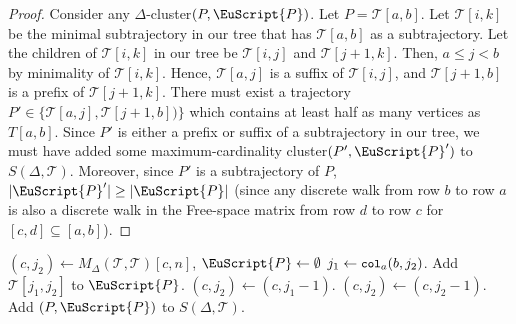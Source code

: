 \documentclass[11pt]{article}
\newcommand{\fancy}[1]{\EuScript{#1}}
\newcommand{\maxcol}{\texttt{\small col}}
\newcommand{\pathlet}{cluster\xspace}
\newcommand{\cT}{\mathcal{T}}
\begin{document}
\begin{proof} 
    Consider any $\Delta$-\pathlet $(P, {\fancy{P}})$.
    Let $P = \mathcal{T}[a, b]$.
    Let $\cT[i, k]$ be the minimal subtrajectory in our tree that has $\cT[a, b]$ as a subtrajectory.
    Let the children of $\cT[i, k]$ in our tree be $\cT[i, j]$ and $\cT[j+1, k]$. Then, $a \le j < b$ by minimality of $\cT[i, k]$.
    Hence, $\cT[a, j]$ is a suffix of $\cT[i, j]$, and $\cT[j+1, b]$ is a prefix of $\cT[j+1, k]$.
    There must exist a trajectory $P' \in \{ \mathcal{T}[a, j],  \mathcal{T}[j+1, b]) \}$ which contains at least half as many vertices as $T[a, b]$.
    Since $P'$ is either a prefix or suffix of a subtrajectory in our tree, we must have added some maximum-cardinality \pathlet $(P', {\fancy{P}}')$ to $S(\Delta, \mathcal{T})$.
    Moreover, since $P'$ is a subtrajectory of $P$, $|{\fancy{P}}'| \geq | {\fancy{P}}|$ (since any discrete walk from row $b$ to row $a$ is also a discrete walk in the Free-space matrix from row $d$ to row $c$ for $[c, d] \subseteq [a, b]$).
\end{proof}
%
%
 \begin{algorithm}[h]
    \caption{Query($P = \mathcal{T}[a, c]$, $\Delta$, $\mathcal{T}, S(\Delta, \mathcal{T}))$}
    \label{alg:query_fast}
    \begin{algorithmic}
    \State $(c, j_2) \gets M_\Delta(\mathcal{T}, \mathcal{T})[c, n]$, ${\fancy{P}} \gets \emptyset$ 
    \If{$\maxcol_a(c, j_2) \neq -\infty $}
    \State $j_1 \gets \maxcol_a(b, j_2)$.
    \State Add    
    $\mathcal{T}[j_1, j_2]$ to  ${\fancy{P}}$.
    \State $(c, j_2) \gets (c, j_1 - 1)$.
    \Else 
    \State $(c, j_2) \gets (c, j_2 - 1)$. 
    \EndIf
    \EndWhile
    \State Add $(P, {\fancy{P}})$ to $S(\Delta, \mathcal{T})$.
    \end{algorithmic}
  \end{algorithm}
%
%
%
\end{document}
